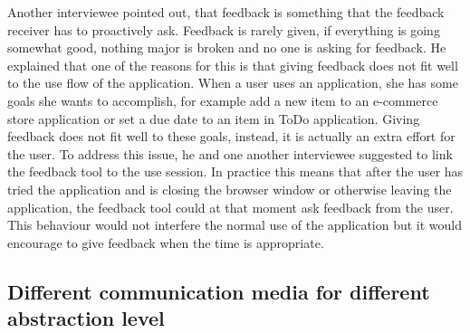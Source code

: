 \documentclass[english,12pt,a4paper,pdftex]{article}
\begin{document}
Another interviewee pointed out, that feedback is something that the feedback receiver has to proactively ask. Feedback is rarely given, if everything is going somewhat good, nothing major is broken and no one is asking for feedback. He explained that one of the reasons for this is that giving feedback does not fit well to the use flow of the application. When a user uses an application, she has some goals she wants to accomplish, for example add a new item to an e-commerce store application or set a due date to an item in ToDo application. Giving feedback does not fit well to these goals, instead, it is actually an extra effort for the user. To address this issue, he and one another interviewee suggested to link the feedback tool to the use session. In practice this means that after the user has tried the application and is closing the browser window or otherwise leaving the application, the feedback tool could at that moment ask feedback from the user. This behaviour would not interfere the normal use of the application but it would encourage to give feedback when the time is appropriate. 

\subsection{Different communication media for different abstraction level}

\end{document}

